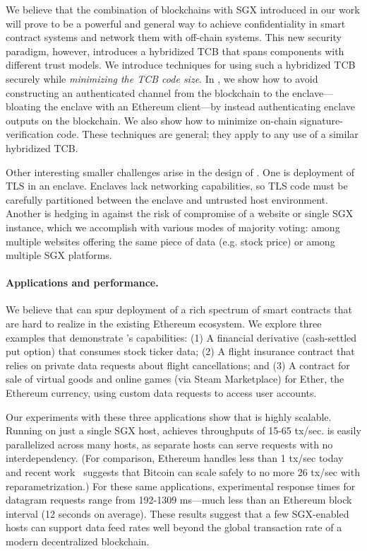 
We believe that the combination of blockchains with SGX introduced in our work will prove to be a powerful and general way to achieve confidentiality in smart contract systems and network them with off-chain systems. This new security paradigm, however, introduces a hybridized TCB that spans components with different trust models. We introduce techniques for using such a hybridized TCB securely while {\em minimizing the TCB code size}. In \tc, we show how to avoid constructing an authenticated channel from the blockchain to the enclave---bloating the enclave with an Ethereum client---by instead authenticating enclave outputs on the blockchain. We also show how to minimize on-chain signature-verification code. These techniques are general; they apply to any use of a similar hybridized TCB.

Other interesting smaller challenges arise in the design of \tc. One is deployment of TLS in an enclave. Enclaves lack networking capabilities, so TLS code must be carefully partitioned between the enclave and untrusted host environment. Another is hedging in \tc against the risk of compromise of a website or single SGX instance, which we accomplish with various modes of majority voting: among multiple websites offering the same piece of data (e.g. stock price) or among multiple SGX platforms.

\paragraph{Applications and performance.} 
We believe that \tc can spur deployment of a rich spectrum of smart contracts that are hard to realize in the existing Ethereum ecosystem. We explore three examples that demonstrate \tc's capabilities: (1) A financial derivative (cash-settled put option) that consumes stock ticker data; (2) A flight insurance contract that relies on private data requests about flight cancellations; and (3) A contract for sale of virtual goods and online games (via Steam Marketplace) for Ether, the Ethereum currency, using custom data requests to access user accounts. 

Our experiments with these three applications show that \tc is highly scalable. Running on just a single SGX host, \tc achieves throughputs of 15-65 tx/sec. \tc is easily parallelized across many hosts, as separate \tc hosts can serve requests with no interdependency. (For comparison, Ethereum handles less than 1 tx/sec today and recent work~\cite{blockchainscaling} suggests that Bitcoin can scale safely to no more 26 tx/sec with reparametrization.) For these same applications, experimental response times for datagram requests range from 192-1309 ms---much less than an Ethereum block interval (12 seconds on average). These results suggest that a few SGX-enabled hosts can support \tc data feed rates well beyond the global transaction rate of a modern decentralized blockchain.


